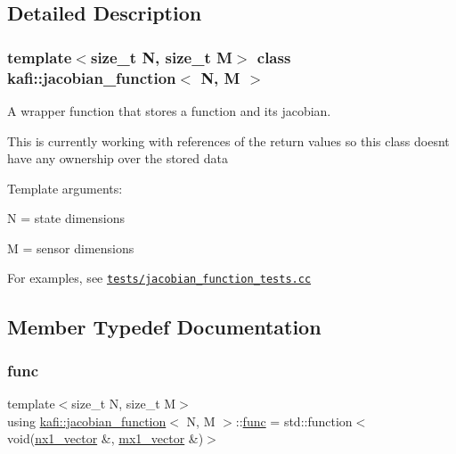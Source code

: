 \subsection{Detailed Description}
\subsubsection*{template$<$size\+\_\+t N, size\+\_\+t M$>$\newline
class kafi\+::jacobian\+\_\+function$<$ N, M $>$}

A wrapper function that stores a function and its jacobian. 

This is currently working with references of the return values so this class doesn\textquotesingle{}t have any ownership over the stored data

Template arguments\+:
\begin{DoxyItemize}
\item {\ttfamily N} = state dimensions
\item {\ttfamily M} = sensor dimensions
\end{DoxyItemize}

For examples, see \href{../../tests/jacobian_function_tests.cc}{\tt tests/jacobian\+\_\+function\+\_\+tests.\+cc} 

\subsection{Member Typedef Documentation}
\mbox{\label{classkafi_1_1jacobian__function_a91cc300a9dba8c3e6787510d48e6fc37}} 
\subsubsection{\texorpdfstring{func}{func}}
{\footnotesize\ttfamily template$<$size\+\_\+t N, size\+\_\+t M$>$ \\
using \hyperlink{classkafi_1_1jacobian__function}{kafi\+::jacobian\+\_\+function}$<$ N, M $>$\+::\hyperlink{classkafi_1_1jacobian__function_a91cc300a9dba8c3e6787510d48e6fc37}{func} =  std\+::function$<$void(\hyperlink{classkafi_1_1jacobian__function_ad7e7a8fbfa3e2785798bd46e5307ca65}{nx1\+\_\+vector} \&, \hyperlink{classkafi_1_1jacobian__function_ad8e32b40bc05db5ee53705a30257761d}{mx1\+\_\+vector} \&)$>$}

